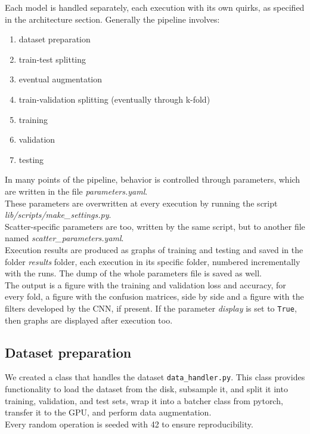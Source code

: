 \documentclass{report}
\begin{document}
Each model is handled separately, each execution with its own quirks, as specified in the architecture section.
Generally the pipeline involves:
\begin{enumerate}
  \item dataset preparation
  \item train-test splitting
  \item eventual augmentation
  \item train-validation splitting (eventually through k-fold)
  \item training
  \item validation
  \item testing
\end{enumerate}

In many points of the pipeline, behavior is controlled through parameters, which are written in the file \textit{parameters.yaml}.\\
These parameters are overwritten at every execution by running the script \textit{lib/scripts/make\_settings.py}.\\
Scatter-specific parameters are too, written by the same script, but to another file named \textit{scatter\_parameters.yaml}.\\

Execution results are produced as graphs of training and testing and saved in the folder \textit{results} folder, each execution in its specific folder, numbered incrementally
with the runs. The dump of the whole parameters file is saved as well.\\
The output is a figure with the training and validation loss and accuracy, for every fold,
a figure with the confusion matrices, side by side and a figure with the filters developed by the CNN, if present.
If the parameter \textit{display} is set to \texttt{True}, then graphs are displayed after execution too.\\

\subsection{Dataset preparation}
We created a class that handles the dataset \texttt{data\_handler.py}. This class provides functionality to load the dataset from the disk, subsample it, and split it
into training, validation, and test sets, wrap it into a batcher class from pytorch, transfer it to the GPU, and perform data augmentation. \\
Every random operation is seeded with 42 to ensure reproducibility.\\
\end{document}
